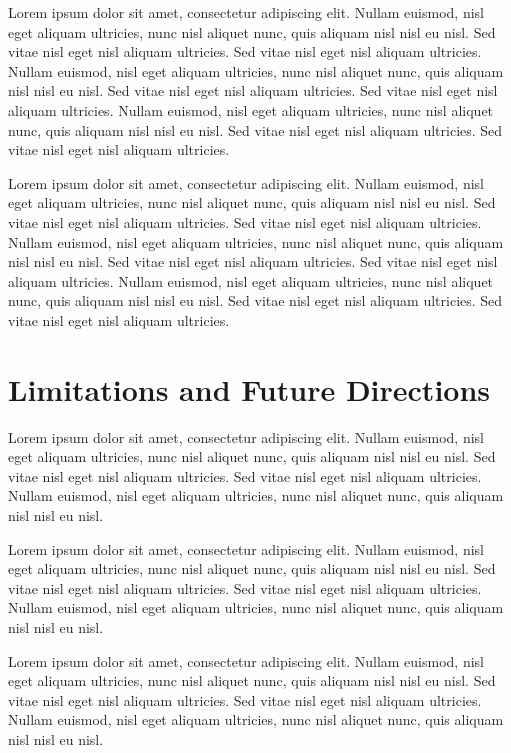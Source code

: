\documentclass[
  jou,
  longtable,
  nolmodern,
  notxfonts,
  notimes,
  colorlinks=true,linkcolor=blue,citecolor=blue,urlcolor=blue,
  jou]{apa7}
\begin{document}
Lorem ipsum dolor sit amet, consectetur adipiscing elit. Nullam euismod,
nisl eget aliquam ultricies, nunc nisl aliquet nunc, quis aliquam nisl
nisl eu nisl. Sed vitae nisl eget nisl aliquam ultricies. Sed vitae nisl
eget nisl aliquam ultricies. Nullam euismod, nisl eget aliquam
ultricies, nunc nisl aliquet nunc, quis aliquam nisl nisl eu nisl. Sed
vitae nisl eget nisl aliquam ultricies. Sed vitae nisl eget nisl aliquam
ultricies. Nullam euismod, nisl eget aliquam ultricies, nunc nisl
aliquet nunc, quis aliquam nisl nisl eu nisl. Sed vitae nisl eget nisl
aliquam ultricies. Sed vitae nisl eget nisl aliquam ultricies.

Lorem ipsum dolor sit amet, consectetur adipiscing elit. Nullam euismod,
nisl eget aliquam ultricies, nunc nisl aliquet nunc, quis aliquam nisl
nisl eu nisl. Sed vitae nisl eget nisl aliquam ultricies. Sed vitae nisl
eget nisl aliquam ultricies. Nullam euismod, nisl eget aliquam
ultricies, nunc nisl aliquet nunc, quis aliquam nisl nisl eu nisl. Sed
vitae nisl eget nisl aliquam ultricies. Sed vitae nisl eget nisl aliquam
ultricies. Nullam euismod, nisl eget aliquam ultricies, nunc nisl
aliquet nunc, quis aliquam nisl nisl eu nisl. Sed vitae nisl eget nisl
aliquam ultricies. Sed vitae nisl eget nisl aliquam ultricies.

\section{Limitations and Future
Directions}\label{limitations-and-future-directions}

Lorem ipsum dolor sit amet, consectetur adipiscing elit. Nullam euismod,
nisl eget aliquam ultricies, nunc nisl aliquet nunc, quis aliquam nisl
nisl eu nisl. Sed vitae nisl eget nisl aliquam ultricies. Sed vitae nisl
eget nisl aliquam ultricies. Nullam euismod, nisl eget aliquam
ultricies, nunc nisl aliquet nunc, quis aliquam nisl nisl eu nisl.

Lorem ipsum dolor sit amet, consectetur adipiscing elit. Nullam euismod,
nisl eget aliquam ultricies, nunc nisl aliquet nunc, quis aliquam nisl
nisl eu nisl. Sed vitae nisl eget nisl aliquam ultricies. Sed vitae nisl
eget nisl aliquam ultricies. Nullam euismod, nisl eget aliquam
ultricies, nunc nisl aliquet nunc, quis aliquam nisl nisl eu nisl.

Lorem ipsum dolor sit amet, consectetur adipiscing elit. Nullam euismod,
nisl eget aliquam ultricies, nunc nisl aliquet nunc, quis aliquam nisl
nisl eu nisl. Sed vitae nisl eget nisl aliquam ultricies. Sed vitae nisl
eget nisl aliquam ultricies. Nullam euismod, nisl eget aliquam
ultricies, nunc nisl aliquet nunc, quis aliquam nisl nisl eu nisl.
\end{document}
